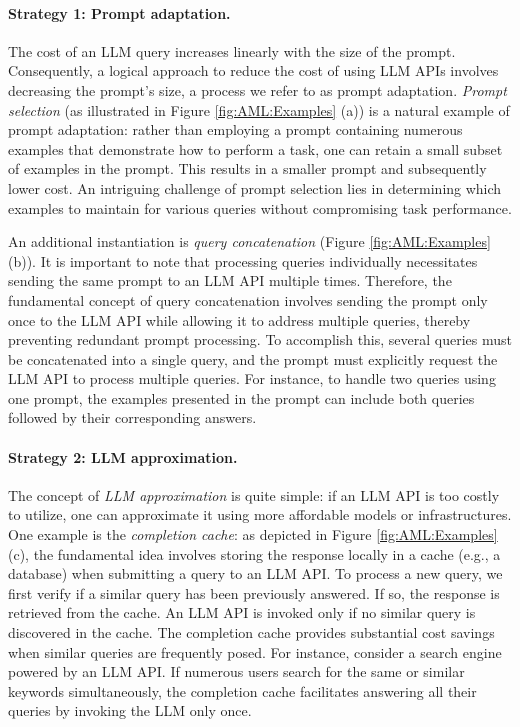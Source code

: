 \documentclass{article}
\numberwithin{equation}{section}
\begin{document}
\paragraph{Strategy 1: Prompt adaptation.} 
The cost of an LLM query increases linearly with the size of the prompt. Consequently, a logical approach to reduce the cost of using LLM APIs involves decreasing the prompt's size, a process we refer to as prompt adaptation. \textit{Prompt selection} (as illustrated in Figure \ref{fig:AML:Examples} (a)) is a natural example of prompt adaptation: rather than employing a prompt containing numerous examples that demonstrate how to perform a task, one can retain a small subset of examples in the prompt. This results in a smaller prompt and subsequently lower cost. An intriguing challenge of prompt selection lies in determining which examples to maintain for various queries without compromising task performance.

An additional instantiation is \textit{query concatenation} (Figure \ref{fig:AML:Examples} (b)). It is important to note that processing queries individually necessitates sending the same prompt to an LLM API multiple times. Therefore, the fundamental concept of query concatenation involves sending the prompt only once to the LLM API while allowing it to address multiple queries, thereby preventing redundant prompt processing. To accomplish this, several queries must be concatenated into a single query, and the prompt must explicitly request the LLM API to process multiple queries. For instance, to handle two queries using one prompt, the examples presented in the prompt can include both queries followed by their corresponding answers.

\paragraph{Strategy 2: LLM approximation.} The concept of \textit{LLM approximation} is quite simple: if an LLM API is too costly to utilize, one can approximate it using more affordable models or infrastructures. One example is the \textit{completion cache}: as depicted in Figure \ref{fig:AML:Examples} (c), the fundamental idea involves storing the response locally in a cache (e.g., a database) when submitting a query to an LLM API. To process a new query, we first verify if a similar query has been previously answered. If so, the response is retrieved from the cache. An LLM API is invoked only if no similar query is discovered in the cache. The completion cache provides substantial cost savings when similar queries are frequently posed. For instance, consider a search engine powered by an LLM API. If numerous users search for the same or similar keywords simultaneously, the completion cache facilitates answering all their queries by invoking the LLM only once.
\end{document}
